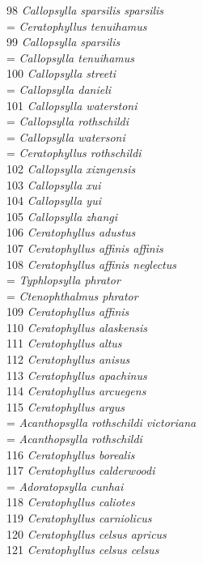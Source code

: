 \documentclass[
]{article}
\begin{document}
98 \emph{Callopsylla sparsilis sparsilis}\\
= \emph{Ceratophyllus tenuihamus}\\
99 \emph{Callopsylla sparsilis}\\
= \emph{Callopsylla tenuihamus}\\
100 \emph{Callopsylla streeti}\\
= \emph{Callopsylla danieli}\\
101 \emph{Callopsylla waterstoni}\\
= \emph{Callopsylla rothschildi}\\
= \emph{Callopsylla watersoni}\\
= \emph{Ceratophyllus rothschildi}\\
102 \emph{Callopsylla xizngensis}\\
103 \emph{Callopsylla xui}\\
104 \emph{Callopsylla yui}\\
105 \emph{Callopsylla zhangi}\\
106 \emph{Ceratophyllus adustus}\\
107 \emph{Ceratophyllus affinis affinis}\\
108 \emph{Ceratophyllus affinis neglectus}\\
= \emph{Typhlopsylla phrator}\\
= \emph{Ctenophthalmus phrator}\\
109 \emph{Ceratophyllus affinis}\\
110 \emph{Ceratophyllus alaskensis}\\
111 \emph{Ceratophyllus altus}\\
112 \emph{Ceratophyllus anisus}\\
113 \emph{Ceratophyllus apachinus}\\
114 \emph{Ceratophyllus arcuegens}\\
115 \emph{Ceratophyllus argus}\\
= \emph{Acanthopsylla rothschildi victoriana}\\
= \emph{Acanthopsylla rothschildi}\\
116 \emph{Ceratophyllus borealis}\\
117 \emph{Ceratophyllus calderwoodi}\\
= \emph{Adoratopsylla cunhai}\\
118 \emph{Ceratophyllus caliotes}\\
119 \emph{Ceratophyllus carniolicus}\\
120 \emph{Ceratophyllus celsus apricus}\\
121 \emph{Ceratophyllus celsus celsus}\\
\end{document}
